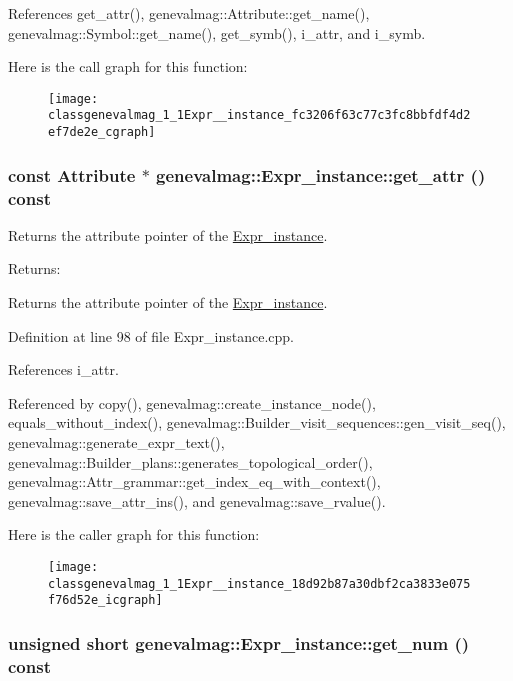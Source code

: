 References get\_\-attr(), genevalmag::Attribute::get\_\-name(), genevalmag::Symbol::get\_\-name(), get\_\-symb(), i\_\-attr, and i\_\-symb.

Here is the call graph for this function:\nopagebreak
\begin{figure}[H]
\begin{center}
\leavevmode
\texttt{[image: classgenevalmag\_1\_1Expr\_\_instance\_fc3206f63c77c3fc8bbfdf4d2ef7de2e\_cgraph]}
\end{center}
\end{figure}
\hypertarget{classgenevalmag_1_1Expr__instance_18d92b87a30dbf2ca3833e075f76d52e}{
\subsubsection[{get\_\-attr}]{\setlength{\rightskip}{0pt plus 5cm}const {\bf Attribute} $\ast$ genevalmag::Expr\_\-instance::get\_\-attr () const}}
\label{classgenevalmag_1_1Expr__instance_18d92b87a30dbf2ca3833e075f76d52e}


Returns the attribute pointer of the \hyperlink{classgenevalmag_1_1Expr__instance}{Expr\_\-instance}. \begin{Desc}
\item[Returns:]\end{Desc}
Returns the attribute pointer of the \hyperlink{classgenevalmag_1_1Expr__instance}{Expr\_\-instance}. 

Definition at line 98 of file Expr\_\-instance.cpp.

References i\_\-attr.

Referenced by copy(), genevalmag::create\_\-instance\_\-node(), equals\_\-without\_\-index(), genevalmag::Builder\_\-visit\_\-sequences::gen\_\-visit\_\-seq(), genevalmag::generate\_\-expr\_\-text(), genevalmag::Builder\_\-plans::generates\_\-topological\_\-order(), genevalmag::Attr\_\-grammar::get\_\-index\_\-eq\_\-with\_\-context(), genevalmag::save\_\-attr\_\-ins(), and genevalmag::save\_\-rvalue().

Here is the caller graph for this function:\nopagebreak
\begin{figure}[H]
\begin{center}
\leavevmode
\texttt{[image: classgenevalmag\_1\_1Expr\_\_instance\_18d92b87a30dbf2ca3833e075f76d52e\_icgraph]}
\end{center}
\end{figure}
\hypertarget{classgenevalmag_1_1Expr__instance_5b5bc716afa9f85418c7f58ed0ac0c01}{
\subsubsection[{get\_\-num}]{\setlength{\rightskip}{0pt plus 5cm}unsigned short genevalmag::Expr\_\-instance::get\_\-num () const}}
\label{classgenevalmag_1_1Expr__instance_5b5bc716afa9f85418c7f58ed0ac0c01}


